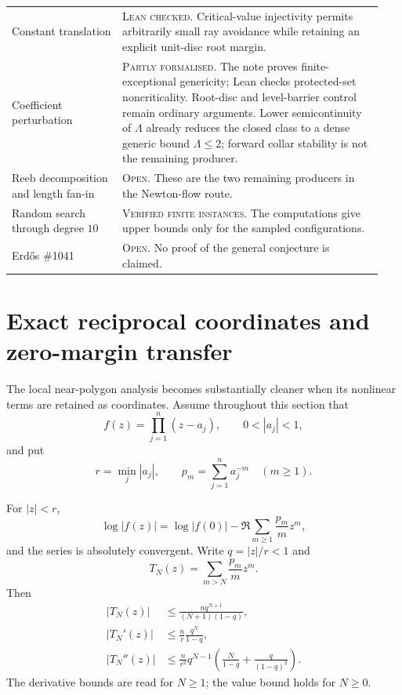 {\begin{longtable}{@{}
  >{\raggedright\arraybackslash}p{0.28\linewidth}
  >{\raggedright\arraybackslash}p{0.66\linewidth}@{}}
\addlinespace
Constant translation &
\textsc{Lean checked.}  Critical-value injectivity permits arbitrarily small
ray avoidance while retaining an explicit unit-disc root margin. \\
\addlinespace
Coefficient perturbation &
\textsc{Partly formalised.}  The note proves finite-exceptional genericity;
Lean checks protected-set noncriticality.  Root-disc and level-barrier control
remain ordinary arguments.  Lower semicontinuity of $\Lambda$ already reduces
the closed class to a dense generic bound $\Lambda\le 2$; forward collar
stability is not the remaining producer. \\
\addlinespace
Reeb decomposition and length fan-in &
\textsc{Open.}  These are the two remaining producers in the Newton-flow
route. \\
\addlinespace
Random search through degree $10$ &
\textsc{Verified finite instances.}  The computations give upper bounds only
for the sampled configurations. \\
\addlinespace
Erd\H{o}s \#1041 &
\textsc{Open.}  No proof of the general conjecture is claimed. \\
\end{longtable}}



\section{Exact reciprocal coordinates and zero-margin transfer}
\label{sec:reciprocal}

The local near-polygon analysis becomes substantially cleaner when its
nonlinear terms are retained as coordinates.  Assume throughout this section
that
\[
 f(z)=\prod_{j=1}^n(z-a_j),\qquad 0<|a_j|<1,
\]
and put
\[
 r=\min_j|a_j|,\qquad p_m=\sum_{j=1}^n a_j^{-m}\quad(m\ge1).
\]

\begin{theorem}
\label{res:reciprocal-expansion}
For $|z|<r$,
\[
 \log|f(z)|
 =\log|f(0)|-\Re\sum_{m\ge1}\frac{p_m}{m}z^m,          \tag{R1}
\]
and the series is absolutely convergent.  Write $q=|z|/r<1$ and
\[
 T_N(z)=\sum_{m>N}\frac{p_m}{m}z^m.
\]
Then
\begin{align*}
 |T_N(z)|
 &\le \frac{nq^{N+1}}{(N+1)(1-q)},                     \tag{R2}\\
 |T_N'(z)|
 &\le \frac nr\frac{q^N}{1-q},                         \tag{R3}\\
 |T_N''(z)|
 &\le \frac n{r^2}q^{N-1}
       \left(\frac N{1-q}+\frac q{(1-q)^2}\right).     \tag{R4}
\end{align*}
The derivative bounds are read for $N\ge1$; the value bound holds for
$N\ge0$.
\end{theorem}

